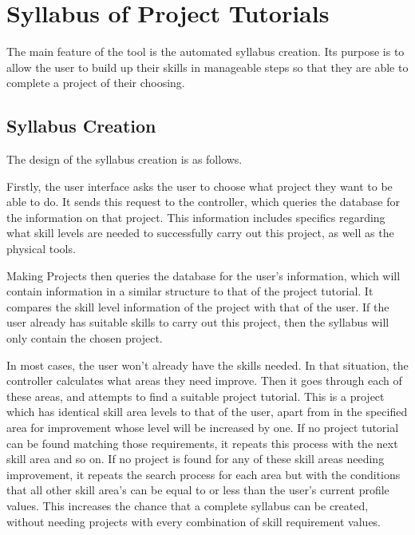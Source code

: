 \documentclass{l4proj}
\begin{document}
\section{Syllabus of Project Tutorials}
The main feature of the tool is the automated syllabus creation. Its purpose is to allow the user to build up their skills in manageable steps so that they are able to complete a project of their choosing. 

\subsection{Syllabus Creation}
The design of the syllabus creation is as follows. 
\begin{algorithm}
\end{algorithm}  

Firstly, the user interface asks the user to choose what project they want to be able to do. It sends this request to the controller, which queries the database for the information on that project. This information includes specifics regarding what skill levels are needed to successfully carry out this project, as well as the physical tools. 

Making Projects then queries the database for the user's information, which will contain information in a similar structure to that of the project tutorial. It compares the skill level information of the project with that of the user. If the user already has suitable skills to carry out this project, then the syllabus will only contain the chosen project.

In most cases, the user won't already have the skills needed. In that situation, the controller calculates what areas they need improve. Then it goes through each of these areas, and attempts to find a suitable project tutorial. This is a project which has identical skill area levels to that of the user, apart from in the specified area for improvement whose level will be increased by one. If no project tutorial can be found matching those requirements, it repeats this process with the next skill area and so on. If no project is found for any of these skill areas needing improvement, it repeats the search process for each area but with the conditions that all other skill area's can be equal to or less than the user's current profile values. This increases the chance that a complete syllabus can be created, without needing projects with every combination of skill requirement values.  
\end{document}
